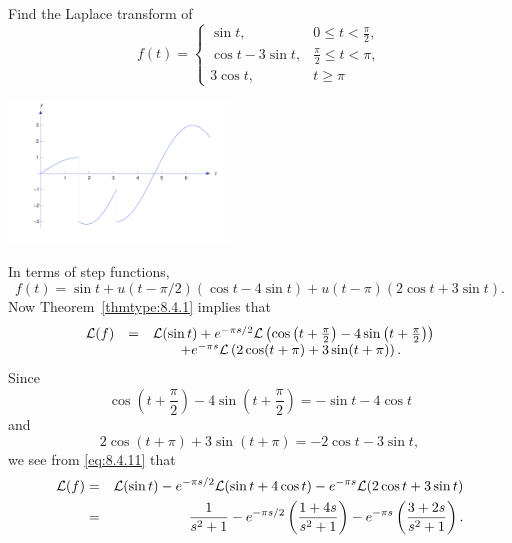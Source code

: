 \documentclass{ximera}
\begin{document}
\begin{example}\label{example:8.4.5}
 Find the Laplace transform of
\begin{equation} \label{eq:8.4.10}
f(t)=\left\{\begin{array}{cl}
\sin t,&0\leq t<\frac{\pi}{2},\\
\cos t-3\sin t,&\frac{\pi}{2}\leq t<\pi,\\
 3\cos t,&t\geq\pi
\end{array}\right.
\end{equation}
\begin{image}
 \includegraphics[height=1.5in]{fig080404.jpg}
 \end{image}
\begin{explanation}
In terms of step functions,
$$
f(t)=\sin t+u(t-\pi/2) (\cos t-4\sin t)+u(t-\pi) (2
\cos t+3\sin t).
$$
Now Theorem~\ref{thmtype:8.4.1} implies that
\begin{equation}\label{eq:8.4.11}
\begin{array}{ccl}
{\cal L}(f)&=&{\cal L}(\sin t)+e^{-\pi s/2}{\cal L}
\left(\cos\left(t+\frac{\pi}{2}\right)-4\sin\left(t+\frac{\pi}{2}\right)\right)\\
&&\qquad+e^{-\pi s}{\cal L}\left(2\cos(t+\pi)+3\sin(t+\pi)\right).
\end{array}
\end{equation}
Since
$$
\cos\left(t+\frac{\pi}{2}\right)-4\sin\left(t+\frac{\pi}{2}\right)=-\sin t-4\cos t
$$
and
$$
 2\cos (t+\pi)+3\sin (t+\pi)=-2\cos t-3\sin t,
$$
we see from \eqref{eq:8.4.11} that
\begin{eqnarray*}
{\cal L}(f)&=&{\cal L}(\sin t)-e^{-\pi s/2}{\cal L}(\sin t+4\cos t)
-e^{-\pi s}{\cal L}(2\cos t+3\sin t)\\
&=&\frac{1}{s^2+1}-e^{-\pi s/2} \left(\frac{1+4s}{s^2+1}\right)
-e^{-\pi s}\left(\frac{3+2s}{s^2+1}\right).
\end{eqnarray*}
\end{explanation}
\end{example}

\end{document}
